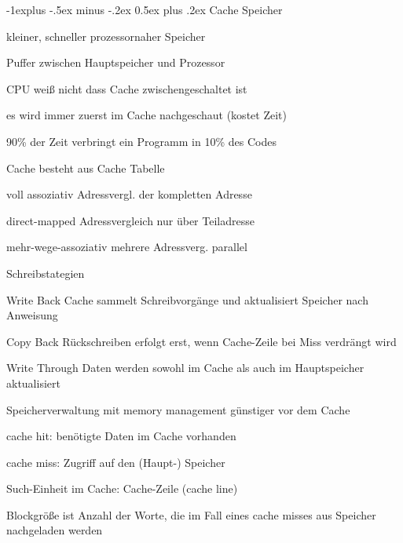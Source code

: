 \documentclass[10pt,landscape]{article}
\makeatletter
\renewcommand{\subsection}{\@startsection{subsection}{2}{0mm}%
                                {-1explus -.5ex minus -.2ex}%
                                {0.5ex plus .2ex}%
                                {\normalfont\normalsize\bfseries}}
\makeatother
\begin{document}
\begin{multicols}{3}
  \subsection{Cache Speicher}
  \begin{itemize*}
    \item kleiner, schneller prozessornaher Speicher
    \item Puffer zwischen Hauptspeicher und Prozessor
    \item CPU weiß nicht dass Cache zwischengeschaltet ist
    \item es wird immer zuerst im Cache nachgeschaut (kostet Zeit)
    \item 90\% der Zeit verbringt ein Programm in 10\% des Codes
    \item Cache besteht aus Cache Tabelle
    \begin{description*}
      \item[voll assoziativ] Adressvergl. der kompletten Adresse
      \item[direct-mapped] Adressvergleich nur über Teiladresse
      \item[mehr-wege-assoziativ] mehrere Adressverg. parallel
    \end{description*}
    \item Schreibstategien
    \begin{description*}
      \item[Write Back] Cache sammelt Schreibvorgänge und aktualisiert Speicher nach Anweisung
      \item[Copy Back] Rückschreiben erfolgt erst, wenn Cache-Zeile bei Miss verdrängt wird
      \item[Write Through] Daten werden sowohl im Cache als auch im Hauptspeicher aktualisiert
    \end{description*}
    \item Speicherverwaltung mit memory management günstiger vor dem Cache
    \item cache hit: benötigte Daten im Cache vorhanden
    \item cache miss: Zugriff auf den (Haupt-) Speicher
    \item Such-Einheit im Cache: Cache-Zeile (cache line)
    \item Blockgröße ist Anzahl der Worte, die im Fall eines cache misses aus Speicher nachgeladen werden

\end{itemize*}
\end{multicols}
\end{document}
